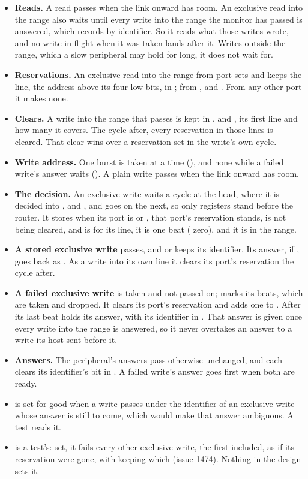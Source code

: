 \begin{itemize}
\item \textbf{Reads.} A read passes when the link onward has room. An
exclusive read into the range also waits until every write into the
range the monitor has passed is answered, which  records by
identifier. So it reads what those writes wrote, and no write in flight
when it was taken lands after it. Writes outside the range, which a slow
peripheral may hold for long, it does not wait for.
\item \textbf{Reservations.} An exclusive read into the range from port
 sets  and keeps the line, the address above its four
low bits, in ; from ,  and .
From any other port it makes none.
\item \textbf{Clears.} A write into the range that passes is kept in
,  and , its first line and how many
it covers. The cycle after, every reservation in those lines is
cleared. That clear wins over a reservation set in the write's own
cycle.
\item \textbf{Write address.} One burst is taken at a time
(), and none while a failed write's answer waits
(). A plain write passes when the link onward has room.
\item \textbf{The decision.} An exclusive write waits a cycle at the
head, where it is decided into ,  and
, and goes on the next, so only registers stand before the
router. It stores when its port is  or , that port's
reservation stands, is not being cleared, and is for its line, it is
one beat ( zero), and it is in the range.
\item \textbf{A stored exclusive write} passes, and  or
 keeps its identifier. Its answer, if , goes back
as . As a write into its own line it clears its port's
reservation the cycle after.
\item \textbf{A failed exclusive write} is taken and not passed on;
 marks its beats, which are taken and dropped. It clears its
port's reservation and adds one to . After its last beat
 holds its answer,  with its identifier in
. That answer is given once every write into the range is
answered, so it never overtakes an answer to a write its host sent
before it.
\item \textbf{Answers.} The peripheral's answers pass otherwise
unchanged, and each clears its identifier's bit in . A failed
write's answer goes first when both are ready.
\item \textbf{} is set for good when a write passes under the
identifier of an exclusive write whose answer is still to come, which
would make that answer ambiguous. A test reads it.
\item \textbf{} is a test's: set, it fails every other
exclusive write, the first included, as if its reservation were gone,
with  keeping which (issue 1474). Nothing in the design sets
it.
\end{itemize}

